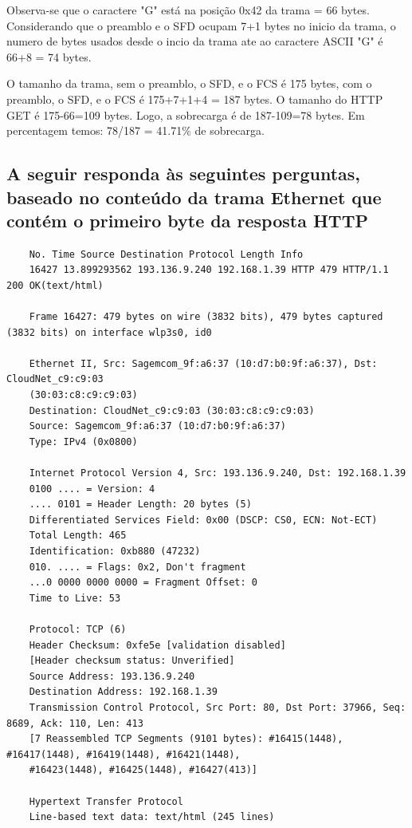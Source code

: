 \documentclass{article}
\begin{document}
Observa-se que o caractere "G" está na posição 0x42 da trama = 66 bytes. Considerando que o preamblo e o SFD ocupam 7+1 bytes no inicio da trama, o numero de bytes usados desde o incio da trama ate ao caractere ASCII "G" é 66+8 = 74 bytes.

O tamanho da trama, sem o preamblo, o SFD, e o FCS é 175 bytes, com o preamblo, o SFD, e o FCS é 175+7+1+4 = 187 bytes.
O tamanho do HTTP GET é 175-66=109 bytes. Logo, a sobrecarga é de 187-109=78 bytes.
Em percentagem temos: 78/187 = 41.71\% de sobrecarga.

\subsection*{A seguir responda às seguintes perguntas, baseado no conteúdo da trama Ethernet que
contém o primeiro byte da resposta HTTP}

\begin{verbatim}
    No. Time Source Destination Protocol Length Info
    16427 13.899293562 193.136.9.240 192.168.1.39 HTTP 479 HTTP/1.1 200 OK(text/html)

    Frame 16427: 479 bytes on wire (3832 bits), 479 bytes captured (3832 bits) on interface wlp3s0, id0

    Ethernet II, Src: Sagemcom_9f:a6:37 (10:d7:b0:9f:a6:37), Dst: CloudNet_c9:c9:03
    (30:03:c8:c9:c9:03)
    Destination: CloudNet_c9:c9:03 (30:03:c8:c9:c9:03)
    Source: Sagemcom_9f:a6:37 (10:d7:b0:9f:a6:37)
    Type: IPv4 (0x0800)

    Internet Protocol Version 4, Src: 193.136.9.240, Dst: 192.168.1.39
    0100 .... = Version: 4
    .... 0101 = Header Length: 20 bytes (5)
    Differentiated Services Field: 0x00 (DSCP: CS0, ECN: Not-ECT)
    Total Length: 465
    Identification: 0xb880 (47232)
    010. .... = Flags: 0x2, Don't fragment
    ...0 0000 0000 0000 = Fragment Offset: 0
    Time to Live: 53

    Protocol: TCP (6)
    Header Checksum: 0xfe5e [validation disabled]
    [Header checksum status: Unverified]
    Source Address: 193.136.9.240
    Destination Address: 192.168.1.39
    Transmission Control Protocol, Src Port: 80, Dst Port: 37966, Seq: 8689, Ack: 110, Len: 413
    [7 Reassembled TCP Segments (9101 bytes): #16415(1448), #16417(1448), #16419(1448), #16421(1448),
    #16423(1448), #16425(1448), #16427(413)]

    Hypertext Transfer Protocol
    Line-based text data: text/html (245 lines)
\end{verbatim}
\end{document}
